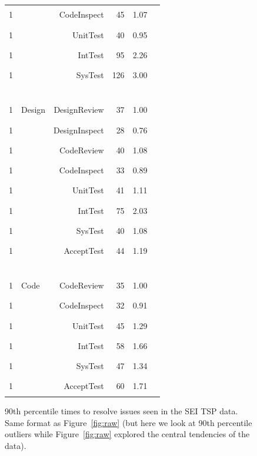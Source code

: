 \documentclass[smallcondensed]{svjour3}
\newcommand{\fig}[1]{Figure~\ref{fig:#1}}
\begin{document}
\begin{figure}[!t]
\begin{center}
\begin{tabular}{c|lr|r|rl}
1 &          &   CodeInspect      & 45 &   1.07 & \textcolor{black}{\rule{10mm}{2mm}}\\
1 &          &   UnitTest          & 40 &   0.95 & \textcolor{black}{\rule{9mm}{2mm}}\\
1 &          &   IntTest          & 95 &      2.26 & \textcolor{black}{\rule{22mm}{2mm}}\\
1 &          &   SysTest          & 126 &    3.00 & \textcolor{black}{\rule{30mm}{2mm}}\\
\hline\multicolumn{6}{c}{~}  \\
1 & Design   &   DesignReview     & 37 &   1.00 & \textcolor{black}{\rule{10mm}{2mm}}\\
1 &          &   DesignInspect    & 28 &    0.76 & \textcolor{black}{\rule{7mm}{2mm}}\\
1 &   &   CodeReview        & 40 &     1.08 & \textcolor{black}{\rule{10mm}{2mm}}\\
1 &   &   CodeInspect      & 33 &     0.89 & \textcolor{black}{\rule{8mm}{2mm}}\\
1 &   &   UnitTest          & 41 &     1.11 & \textcolor{black}{\rule{12mm}{2mm}}\\
1 &   &   IntTest          & 75 &    2.03 & \textcolor{black}{\rule{20mm}{2mm}}\\
1 &   &   SysTest           & 40 &     1.08 & \textcolor{black}{\rule{10mm}{2mm}}\\
1 &   &   AcceptTest       & 44 &     1.19 & \textcolor{black}{\rule{12mm}{2mm}}\\
\hline\multicolumn{6}{c}{~}  \\
1 &  Code   &   CodeReview      & 35    & 1.00 & \textcolor{black}{\rule{10mm}{2mm}}\\
1 &    &   CodeInspect    & 32   & 0.91 & \textcolor{black}{\rule{9mm}{2mm}}\\
1 &   &   UnitTest      & 45  & 1.29 & \textcolor{black}{\rule{12mm}{2mm}}\\
1 &    &   IntTest         & 58   & 1.66 & \textcolor{black}{\rule{16mm}{2mm}}\\
1 &   &   SysTest        & 47 &    1.34 & \textcolor{black}{\rule{13mm}{2mm}}\\
1 &    &   AcceptTest      & 60 &   1.71 & \textcolor{black}{\rule{17mm}{2mm}}\\

\end{tabular}
\end{center}
\caption{90th percentile times to resolve issues seen in the SEI TSP data.   Same format as \fig{raw} (but here we look at 90th percentile
outliers while   \fig{raw} explored the central tendencies of the data).}\label{fig:last}
\end{figure}
\end{document}
